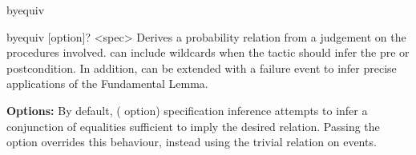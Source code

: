 \begin{tactic}{byequiv}

  \begin{tsyntax}{byequiv [option]? <spec>}
  Derives a probability relation from a \prhl judgement on the
  procedures involved.  can include wildcards when the
  tactic should infer the pre or postcondition. In addition,
   can be extended with a failure event to infer precise
  applications of the Fundamental Lemma.

  \textbf{Options:} By default, ( option) specification
  inference attempts to infer a conjunction of equalities sufficient
  to imply the desired relation. Passing the  option
  overrides this behaviour, instead using the trivial relation on
  events.


\end{tsyntax}
\end{tactic}
